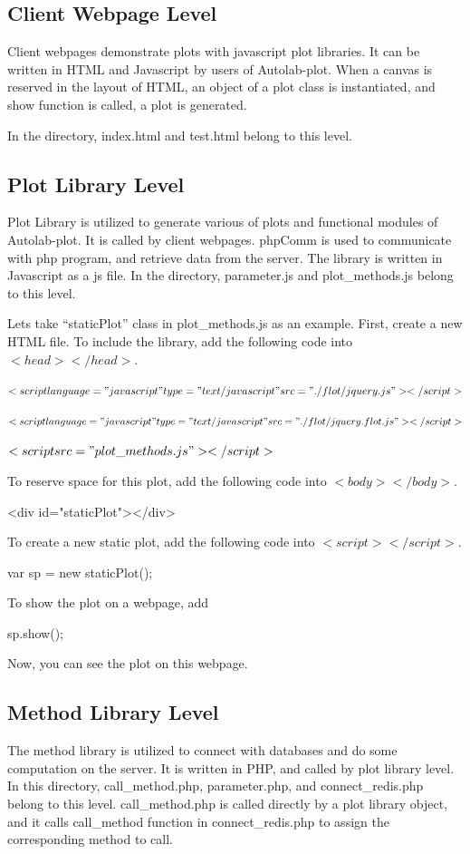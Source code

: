 \documentclass{article}
\begin{document}
\subsection{Client Webpage Level}
Client webpages demonstrate plots with javascript plot libraries.
It can be written in HTML and Javascript by users of Autolab-plot.
When a canvas is reserved in the layout of HTML, an object of a plot class is instantiated, and show function is called, a plot is generated.

In the directory, index.html and test.html belong to this level.

\subsection{Plot Library Level}
Plot Library is utilized to generate various of plots and functional modules of Autolab-plot.
It is called by client webpages.
phpComm is used to communicate with php program, and retrieve data from the server.
The library is written in Javascript as a js file.
In the directory, parameter.js and plot\_methods.js belong to this level.

Lets take ``staticPlot'' class in plot\_methods.js as an example.
First, create a new HTML file.
To include the library, add the following code into $<head></head>$.

$<script language="javascript" type="text/javascript" src="./flot/jquery.js"></script>$

$<script language="javascript" type="text/javascript" src="./flot/jquery.flot.js"></script>$

$<script src="plot\_methods.js"></script>$

To reserve space for this plot, add the following code into $<body></body>$.

\item{<div id="staticPlot"></div>}

To create a new static plot, add the following code into $<script></script>$.

var sp = new staticPlot();

To show the plot on a webpage, add

sp.show();

Now, you can see the plot on this webpage.

\subsection{Method Library Level}
The method library is utilized to connect with databases and do some computation on the server.
It is written in PHP, and called by plot library level.
In this directory, call\_method.php, parameter.php, and connect\_redis.php belong to this level.
call\_method.php is called directly by a plot library object, and it calls call_method function in connect\_redis.php to assign the corresponding method to call.
\end{document}
